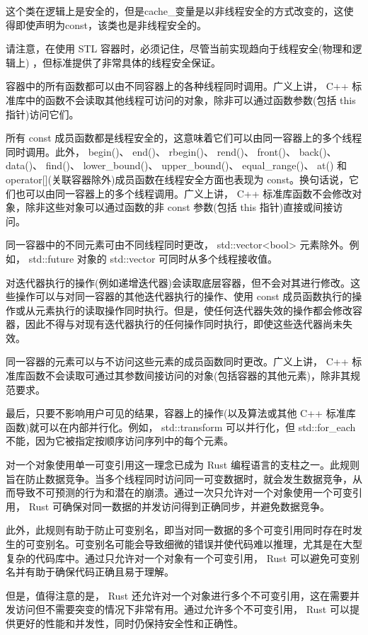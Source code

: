 这个类在逻辑上是安全的，但是cache\_变量是以非线程安全的方式改变的，这使得即使声明为const，该类也是非线程安全的。

请注意，在使用 STL 容器时，必须记住，尽管当前实现趋向于线程安全(物理和逻辑上) ，但标准提供了非常具体的线程安全保证。

容器中的所有函数都可以由不同容器上的各种线程同时调用。广义上讲， C++ 标准库中的函数不会读取其他线程可访问的对象，除非可以通过函数参数(包括 this 指针)访问它们。

所有 const 成员函数都是线程安全的，这意味着它们可以由同一容器上的多个线程同时调用。此外， begin()、 end()、 rbegin()、 rend()、 front()、 back()、 data()、 find()、 lower\_bound()、 upper\_bound()、 equal\_range()、 at() 和 operator[](关联容器除外)成员函数在线程安全方面也表现为 const。换句话说，它们也可以由同一容器上的多个线程调用。广义上讲， C++ 标准库函数不会修改对象，除非这些对象可以通过函数的非 const 参数(包括 this 指针)直接或间接访问。

同一容器中的不同元素可由不同线程同时更改， std::vector<bool> 元素除外。例如， std::future 对象的 std::vector 可同时从多个线程接收值。

对迭代器执行的操作(例如递增迭代器)会读取底层容器，但不会对其进行修改。这些操作可以与对同一容器的其他迭代器执行的操作、使用 const 成员函数执行的操作或从元素执行的读取操作同时执行。但是，使任何迭代器失效的操作都会修改容器，因此不得与对现有迭代器执行的任何操作同时执行，即使这些迭代器尚未失效。

同一容器的元素可以与不访问这些元素的成员函数同时更改。广义上讲， C++ 标准库函数不会读取可通过其参数间接访问的对象(包括容器的其他元素)，除非其规范要求。

最后，只要不影响用户可见的结果，容器上的操作(以及算法或其他 C++ 标准库函数)就可以在内部并行化。例如， std::transform 可以并行化，但 std::for\_each 不能，因为它被指定按顺序访问序列中的每个元素。

对一个对象使用单一可变引用这一理念已成为 Rust 编程语言的支柱之一。此规则旨在防止数据竞争。当多个线程同时访问同一可变数据时，就会发生数据竞争，从而导致不可预测的行为和潜在的崩溃。通过一次只允许对一个对象使用一个可变引用， Rust 可确保对同一数据的并发访问得到正确同步，并避免数据竞争。

此外，此规则有助于防止可变别名，即当对同一数据的多个可变引用同时存在时发生的可变别名。可变别名可能会导致细微的错误并使代码难以推理，尤其是在大型复杂的代码库中。通过只允许对一个对象有一个可变引用， Rust 可以避免可变别名并有助于确保代码正确且易于理解。

但是，值得注意的是， Rust 还允许对一个对象进行多个不可变引用，这在需要并发访问但不需要突变的情况下非常有用。通过允许多个不可变引用， Rust 可以提供更好的性能和并发性，同时仍保持安全性和正确性。






